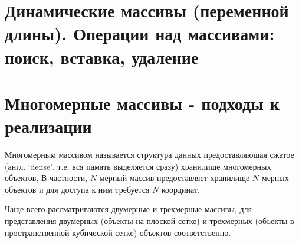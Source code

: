 \section{Динамические массивы (переменной длины). Операции над массивами: поиск, вставка, удаление}
\section{Многомерные массивы - подходы к реализации}
Многомерным массивом называется структура данных предоставляющая сжатое (англ. `dense', т.е. вся память выделяется сразу) хранилище многомерных объектов,
В частности, \(N\)-мерный массив предоставляет хранилище \(N\)-мерных объектов и для доступа к ним требуется \(N\) координат.

Чаще всего рассматриваются двумерные и трехмерные массивы, для представления двумерных (объекты на плоской сетке) и трехмерных (объекты в
пространственной кубической сетке) объектов соответственно.

